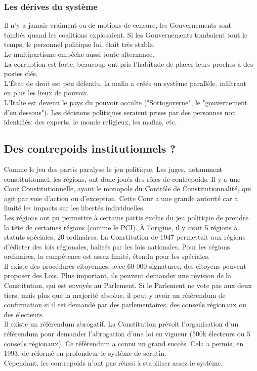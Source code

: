 \documentclass[10pt, a4paper, openany]{book}
\begin{document}
\subsubsection{Les dérives du système}

Il n'y a jamais vraiment eu de motions de censure, les Gouvernements sont tombés quand les coalitions explosaient. Si les Gouvernements tombaient tout le temps, le personnel politique lui, était très stable. \\
Le multipartisme empêche aussi toute alternance. \\
La corruption est forte, beaucoup ont pris l'habitude de placer leurs proches à des postes clés. \\
L'État de droit est peu défendu, la mafia a créée un système parallèle, infiltrant en plus les lieux de pouvoir. \\
L'Italie est devenu le pays du pouvoir occulte ("Sottogoverne", le "gouvernement d'en dessous"). Les décisions politiques seraient prises par des personnes non identifiés: des experts, le monde religieux, les mafias, etc. \\

\subsection{Des contrepoids institutionnels ?} 

Comme le jeu des partis paralyse le jeu politique. Les juges, notamment constitutionnel, les régions, ont donc joués des rôles de contrepoids. Il y a une Cour Constitutionnelle, ayant le monopole du Contrôle de Constitutionnalité, qui agit par voie d'action ou d'exception. Cette Cour a une grande autorité car a limité les impacts sur les libertés individuelles. \\
Les régions ont pu permettre à certains partis exclus du jeu politique de prendre la tête de certaines régions (comme le PCI). À l'origine, il y avait 5 régions à statuts spéciales, 20 ordinaires. La Constitution de 1947 permettait aux régions d'édicter des lois régionales, balisés par les lois nationales. Pour les régions ordinaires, la compétence est assez limité, étendu pour les spéciales. \\
Il existe des procédures citoyennes, avec 60 000 signatures, des citoyens peuvent proposer des Lois. Plus important, ils peuvent demander une révision de la Constitution, qui est envoyée au Parlement. Si le Parlement ne vote pas aux deux tiers, mais plus que la majorité absolue, il peut y avoir un référendum de confirmation si il est demandé par des parlementaires, des conseils régionaux ou des électeurs. \\
Il existe un référendum abrogatif. La Constitution prévoit l'organisation d'un référendum pour demander l'abrogation d'une loi en vigueur (500k électeurs ou 5 conseils régionaux). Ce référendum a connu un grand succès. Cela a permis, en 1993, de réformé en profondeur le système de scrutin. \\
Cependant, les contrepoids n'ont pas réussi à stabiliser assez le système.
\end{document}

